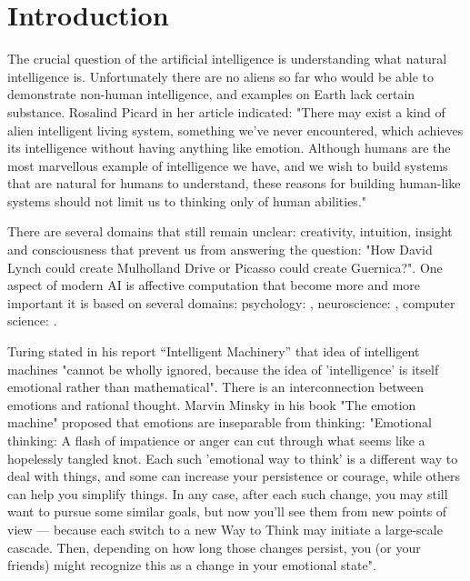 \section{Introduction}

The crucial question of the artificial intelligence is understanding what natural intelligence is. Unfortunately there are no aliens so far who would be able to demonstrate non-human intelligence, and examples on Earth lack certain substance. Rosalind Picard in her article indicated: "There may exist a kind of alien intelligent living system, something we’ve never encountered, which achieves its  intelligence without having anything like emotion. Although humans are the most marvellous example of intelligence we have, and we wish to build systems that are natural for humans to understand, these reasons for building human-like systems should not limit us to thinking only of human abilities." \cite{affectivecomputingchallanges}

There are several domains that still remain unclear: creativity, intuition, insight and consciousness that prevent us from answering the question: "How David Lynch could create Mulholland Drive or Picasso could create Guernica?". One aspect of modern AI is affective computation that become more and more important it is based on several domains: psychology: \cite{natureofemotions, appraisal_determinants_of_emotions, appraisal_considered_as_a_process, putting_appraisal_in_context, sex_differencies}, neuroscience: \cite{emotionsbraintorobot, parsingreward, neuromodulatory, cubeofemotions, natureofemotions, putting_appraisal_in_context, anatomic}, computer science: \cite{intelligent_machinery, emotionandsociable, senticcomputing, hourglass, affectivemodelofinterplay, affectivecomputing, dont_worry_be_happy, hourglass, senticcomputing, parsingreward, emotionsbraintorobot, motivationalrewardframework, roleofemotions, computationalmodelsemotionscognition}.

Turing stated in his report ``Intelligent Machinery'' \cite{intelligent_machinery} that idea of intelligent machines "cannot be wholly ignored, because the idea of 'intelligence' is itself emotional rather than mathematical".
There is an interconnection between emotions and rational thought. Marvin Minsky in his book "The emotion machine" \cite{emotionmachine} proposed that emotions are inseparable from thinking: "Emotional thinking: A flash of impatience or anger can cut through what seems like a hopelessly tangled knot. Each such 'emotional way to think' is a different way to deal with things, and some can increase your persistence or courage, while others can help you simplify things. In any case, after each such change, you may still want to pursue some similar goals, but now you'll see them from new points of view — because each switch to a new Way to Think may initiate a large-scale cascade. Then, depending on how long those changes persist, you (or your friends) might recognize this as a change in your emotional state".

